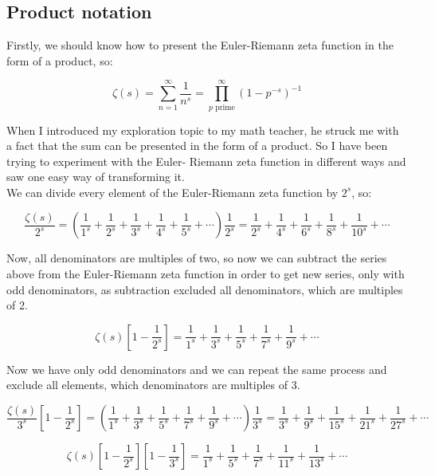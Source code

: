 \documentclass[a4paper]{article}
\begin{document}
\subsection{Product notation}
\label{sec-5-1}

Firstly, we should know how to present the Euler-Riemann zeta function in the
form of a product, so:

\begin{equation}
  \zeta(s)=\sum_{n=1}^{\infty} \frac{1}{n^s}=\prod_{p \text{ prime}}^{\infty} (1-p^{-s})^{-1}
\end{equation}

When I introduced my exploration topic to my math teacher, he struck me with a
fact that the sum can be presented in the form of a product. So I have been
trying to experiment with the Euler- Riemann zeta function in different ways and
saw one easy way of transforming it.\\

We can divide every element of the Euler-Riemann zeta function by $2^s$, so:

\begin{equation*}
  \frac{\zeta(s)}{2^s}= (\frac{1}{1^s}+\frac{1}{2^s}+\frac{1}{3^s}+
  \frac{1}{4^s}+\frac{1}{5^s}+\cdots)\frac{1}{2^s}=
  \frac{1}{2^s}+\frac{1}{4^s}+\frac{1}{6^s}+
  \frac{1}{8^s}+\frac{1}{10^s}+\cdots
  \end{equation*}

Now, all denominators are multiples of two, so now we can subtract the series
above from the Euler-Riemann zeta function in order to get new series, only with
odd denominators, as subtraction excluded all denominators, which are multiples
of 2. 

\begin{equation*}
  \zeta(s)[1-\frac{1}{2^s}]=\frac{1}{1^s}+\frac{1}{3^s}+\frac{1}{5^s}+
  \frac{1}{7^s}+\frac{1}{9^s}+\cdots
  \end{equation*}

Now we have only odd denominators and we can repeat the same process and exclude
all elements, which denominators are multiples of 3.

\begin{equation*}
  \frac{\zeta(s)}{3^s}[1-\frac{1}{2^s}] = (\frac{1}{1^s}+\frac{1}{3^s}+\frac{1}{5^s}+
  \frac{1}{7^s}+\frac{1}{9^s}+\cdots)\frac{1}{3^s}=\frac{1}{3^s}+\frac{1}{9^s}+\frac{1}{15^s}+
  \frac{1}{21^s}+\frac{1}{27^s}+\cdots
\end{equation*}

\begin{equation*}
  \zeta(s)[1-\frac{1}{2^s}][1-\frac{1}{3^s}] = \frac{1}{1^s}+\frac{1}{5^s}+\frac{1}{7^s}+
  \frac{1}{11^s}+\frac{1}{13^s}+\cdots
  \end{equation*}
\end{document}
